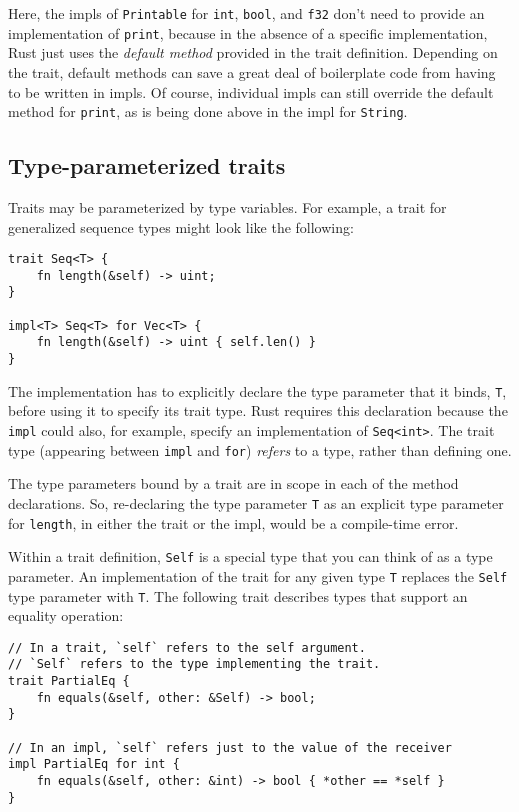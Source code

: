 \documentclass[]{article}
\begin{document}
Here, the impls of \texttt{Printable} for \texttt{int}, \texttt{bool},
and \texttt{f32} don't need to provide an implementation of
\texttt{print}, because in the absence of a specific implementation,
Rust just uses the \emph{default method} provided in the trait
definition. Depending on the trait, default methods can save a great
deal of boilerplate code from having to be written in impls. Of course,
individual impls can still override the default method for
\texttt{print}, as is being done above in the impl for \texttt{String}.

\subsection{Type-parameterized traits}\label{type-parameterized-traits}

Traits may be parameterized by type variables. For example, a trait for
generalized sequence types might look like the following:

\begin{verbatim}
trait Seq<T> {
    fn length(&self) -> uint;
}

impl<T> Seq<T> for Vec<T> {
    fn length(&self) -> uint { self.len() }
}
\end{verbatim}

The implementation has to explicitly declare the type parameter that it
binds, \texttt{T}, before using it to specify its trait type. Rust
requires this declaration because the \texttt{impl} could also, for
example, specify an implementation of
\texttt{Seq\textless{}int\textgreater{}}. The trait type (appearing
between \texttt{impl} and \texttt{for}) \emph{refers} to a type, rather
than defining one.

The type parameters bound by a trait are in scope in each of the method
declarations. So, re-declaring the type parameter \texttt{T} as an
explicit type parameter for \texttt{length}, in either the trait or the
impl, would be a compile-time error.

Within a trait definition, \texttt{Self} is a special type that you can
think of as a type parameter. An implementation of the trait for any
given type \texttt{T} replaces the \texttt{Self} type parameter with
\texttt{T}. The following trait describes types that support an equality
operation:

\begin{verbatim}
// In a trait, `self` refers to the self argument.
// `Self` refers to the type implementing the trait.
trait PartialEq {
    fn equals(&self, other: &Self) -> bool;
}

// In an impl, `self` refers just to the value of the receiver
impl PartialEq for int {
    fn equals(&self, other: &int) -> bool { *other == *self }
}
\end{verbatim}
\end{document}
